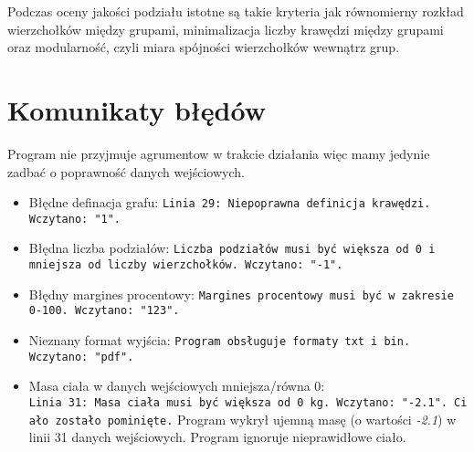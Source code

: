 \documentclass[]{article}
\begin{document}
Podczas oceny jakości podziału istotne są takie kryteria jak równomierny rozkład wierzchołków między grupami, minimalizacja liczby krawędzi między grupami oraz modularność, czyli miara spójności wierzchołków wewnątrz grup.


\section{Komunikaty błędów}\label{header-n281}

Program nie przyjmuje agrumentow w trakcie działania więc mamy jedynie zadbać o poprawność danych wejściowych.

\begin{itemize}
\item
    Błędne definacja grafu: \texttt{Linia 29: Niepoprawna definicja krawędzi. Wczytano: "1".}
\item
    Błędna liczba podziałów: \texttt{Liczba podziałów musi być większa od 0 i mniejsza od liczby wierzchołków. Wczytano: "-1".}
\item
    Błędny margines procentowy: \texttt{Margines procentowy musi być w zakresie 0-100. Wczytano: "123".}
\item
    Nieznany format wyjścia: \texttt{Program obsługuje formaty txt i bin. Wczytano: "pdf".}
\item
  Masa ciała w danych wejściowych mniejsza/równa 0:
  \texttt{Linia\ 31:\ Masa\ ciała\ musi\ być\ większa\ od\ 0\ kg.\ Wczytano:\ "-2.1".\ Ciało\ zostało\ pominięte.}
  Program wykrył ujemną masę (o wartości \emph{-2.1}) w linii 31 danych
  wejściowych. Program ignoruje nieprawidłowe ciało.
\end{itemize}
\end{document}
